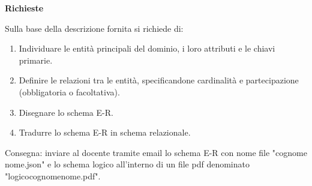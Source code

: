 \documentclass[a4paper,12pt]{article}
\begin{document}
	\textbf{Richieste}
	
	Sulla base della descrizione fornita si richiede di:
	
	\begin{enumerate}
		\item Individuare le entità principali del dominio, i loro attributi e le chiavi primarie.
		\item Definire le relazioni tra le entità, specificandone cardinalità e partecipazione (obbligatoria o facoltativa).
		\item Disegnare lo schema E-R.
		\item Tradurre lo schema E-R in schema relazionale.
	\end{enumerate}
	
	Consegna: inviare al docente tramite email lo schema E-R con nome file "cognome nome.json"
	e lo schema logico all'interno di un file pdf denominato "logicocognomenome.pdf".
	
\end{document}
